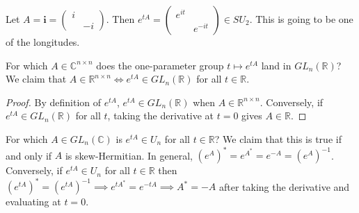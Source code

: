 \documentclass{article}
\newcommand{\C}{\mathbb{C}}
\newcommand{\R}{\mathbb{R}}
\begin{document}
\begin{example}
Let $A=\mathbf i=\begin{pmatrix}
i&\\&-i
\end{pmatrix}$. Then $e^{tA}=\begin{pmatrix}
e^{it}&\\&e^{-it}
\end{pmatrix}\in SU_2$. This is going to be one of the longitudes.
\end{example}
For which $A\in \C^{n\times n}$ does the one-parameter group $t\mapsto e^{tA}$ land in $GL_n(\R)$? We claim that $A\in \R^{n\times n}\iff e^{tA}\in GL_n(\R)$ for all $t\in \R$.
\begin{proof}
By definition of $e^{tA}$, $e^{tA}\in GL_n(\R)$ when $A\in \R^{n\times n}$. Conversely, if $e^{tA}\in GL_n(\R)$ for all $t$, taking the derivative at $t=0$ gives $A\in \R$. 
\end{proof}
For which $A\in GL_n(\C)$ is $e^{tA}\in U_n$ for all $t\in \R$? We claim that this is true if and only if $A$ is skew-Hermitian.
In general, $(e^A)^*=e^{A^*}=e^{-A}=(e^A)^{-1}$. Conversely, if $e^{tA}\in U_n$ for all $t\in \R$ then $(e^{tA})^*=(e^{tA})^{-1}\implies e^{tA^*}=e^{-tA}\implies A^*=-A$ after taking the derivative and evaluating at $t=0$.
\end{document}

